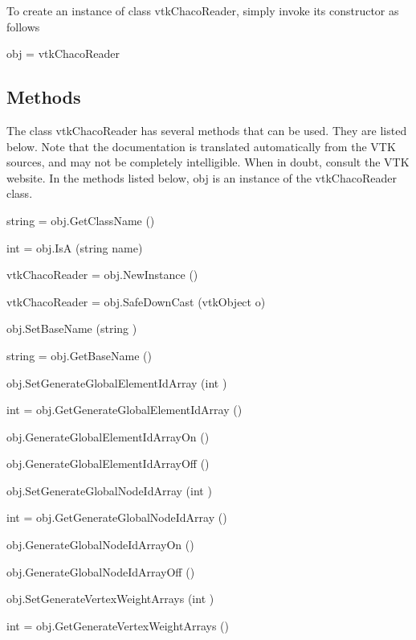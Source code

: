To create an instance of class vtk\-Chaco\-Reader, simply invoke its constructor as follows \begin{DoxyVerb}  obj = vtkChacoReader
\end{DoxyVerb}
 \hypertarget{vtkwidgets_vtkxyplotwidget_Methods}{}\subsection{Methods}\label{vtkwidgets_vtkxyplotwidget_Methods}
The class vtk\-Chaco\-Reader has several methods that can be used. They are listed below. Note that the documentation is translated automatically from the V\-T\-K sources, and may not be completely intelligible. When in doubt, consult the V\-T\-K website. In the methods listed below, {\ttfamily obj} is an instance of the vtk\-Chaco\-Reader class. 
\begin{DoxyItemize}
\item {\ttfamily string = obj.\-Get\-Class\-Name ()}  
\item {\ttfamily int = obj.\-Is\-A (string name)}  
\item {\ttfamily vtk\-Chaco\-Reader = obj.\-New\-Instance ()}  
\item {\ttfamily vtk\-Chaco\-Reader = obj.\-Safe\-Down\-Cast (vtk\-Object o)}  
\item {\ttfamily obj.\-Set\-Base\-Name (string )}  
\item {\ttfamily string = obj.\-Get\-Base\-Name ()}  
\item {\ttfamily obj.\-Set\-Generate\-Global\-Element\-Id\-Array (int )}  
\item {\ttfamily int = obj.\-Get\-Generate\-Global\-Element\-Id\-Array ()}  
\item {\ttfamily obj.\-Generate\-Global\-Element\-Id\-Array\-On ()}  
\item {\ttfamily obj.\-Generate\-Global\-Element\-Id\-Array\-Off ()}  
\item {\ttfamily obj.\-Set\-Generate\-Global\-Node\-Id\-Array (int )}  
\item {\ttfamily int = obj.\-Get\-Generate\-Global\-Node\-Id\-Array ()}  
\item {\ttfamily obj.\-Generate\-Global\-Node\-Id\-Array\-On ()}  
\item {\ttfamily obj.\-Generate\-Global\-Node\-Id\-Array\-Off ()}  
\item {\ttfamily obj.\-Set\-Generate\-Vertex\-Weight\-Arrays (int )}  
\item {\ttfamily int = obj.\-Get\-Generate\-Vertex\-Weight\-Arrays ()}  

\end{DoxyItemize}
